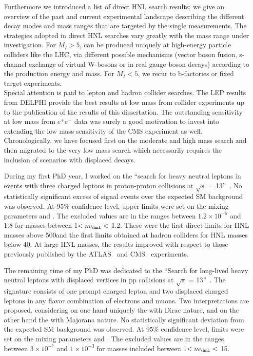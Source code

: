 Furthermore we introduced a list of direct HNL search results; we give an overview
of the past and current experimental landscape describing the different decay modes and
mass ranges that are targeted by the single measurements.
The strategies adopted in direct HNL searches vary greatly with the mass range under investigation. For $M_{I} > 5$\GeV, \hnl can be
produced uniquely at high-energy particle colliders like the LHC, via
different possible 
mechanisms (vector boson fusion, s-channel exchange of virtual
W-bosons or in real gauge boson decays) according to the production
energy and \hnl mass. For $M_{I} < 5$\GeV, we recur to b-factories
or fixed target experiments. \\
Special attention is paid to lepton and hadron collider
searches. The LEP results from DELPHI provide the best results at low mass from collider experiments up to the publication of the results
of this dissertation. The outstanding sensitivity at low mass from
$e^{+}e^{-}$ data was surely a good motivation to invest into extending the low mass sensitivity of
the CMS experiment as well.\\

Chronologically, we have focused first on the
moderate and high mass search and then migrated to the very low mass search which
necessarily requires the inclusion of scenarios with displaced decays.

During my first PhD year, I worked on the ``search for heavy neutral leptons in events with three charged
 leptons in proton-proton collisions at $\sqrt{s}$ =
 13\TeV''~\cite{Sirunyan:2018mtv}. No 
 statistically significant excess of signal events over the expected
SM background was observed. At 95\% confidence level, upper limits were set on the mixing
parameters \mixpare and \mixparm. The excluded values are in the
ranges between $1.2\times 10^{-5}$ and $1.8$ for masses 
between 1\GeV $< m_\hnl <$ 1.2\TeV. 
These were the first direct limits for HNL masses above 500\GeV and the first
limits obtained at hadron colliders for HNL masses below 40\GeV.
At large HNL masses, the results improved with respect to those previously published
by the ATLAS~\cite{Aad_2015} and CMS~\cite{Khachatryan_2015,Sirunyan:2018xiv}
experiments. 

The remaining time of my PhD was dedicated to the ``Search for long-lived heavy neutral leptons with displaced
vertices in pp collisions at $\sqrt{s}$ =
 13\TeV''~\cite{CMS-PAS-EXO-20-009}.
The signature consists of one prompt charged lepton and two displaced
charged leptons in any flavor combination of electrons
and muons. Two interpretations are proposed, considering
on one hand uniquely the \hnl with 
Dirac nature, and on the other hand the \hnl with Majorana nature. 
No statistically significant deviation from the expected
SM background was observed. At 95\% confidence level, limits were set on the mixing
parameters \mixpare and \mixparm.
The excluded values are in the
ranges between $3\times 10^{-7}$ and $1\times 10^{-3}$ for masses included
between 1\GeV $< m_\hnl <$ 15\GeV. \\


